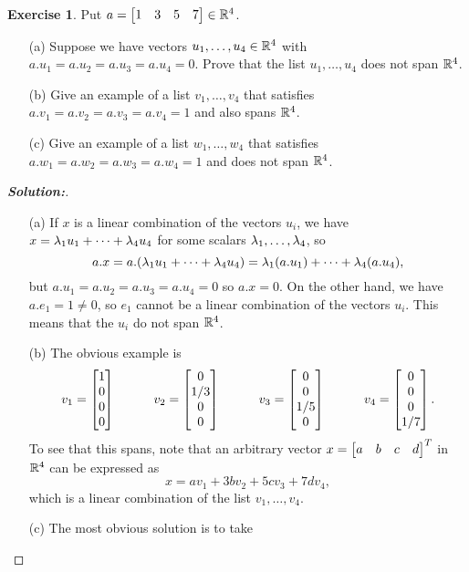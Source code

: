 \documentclass[a4paper]{amsart}
\theoremstyle{definition}
\newtheorem{exercise}{Exercise}
\newenvironment{solution}{\begin{proof}[\textbf{Solution:}] \vphantom{u}}{\end{proof}}
\begin{document}
\begin{exercise}\label{ex-fullspan-ii}
 Put $a=\left[\begin{matrix} 1 & 3 & 5 & 7 \end{matrix}\right]\in{\mathbb{R}}^4$.
 \begin{itemize}
  \item[(a)] Suppose we have vectors $u_1,\dotsc,u_4\in{\mathbb{R}}^4$ with
   $a.u_1=a.u_2=a.u_3=a.u_4=0$.  Prove that the list $u_1,\dotsc,u_4$
   does not span ${\mathbb{R}}^4$.
  \item[(b)] Give an example of a list $v_1,\dotsc,v_4$ that 
   satisfies $a.v_1=a.v_2=a.v_3=a.v_4=1$ and also spans ${\mathbb{R}}^4$.
  \item[(c)] Give an example of a list $w_1,\dotsc,w_4$ that 
   satisfies $a.w_1=a.w_2=a.w_3=a.w_4=1$ and does not span ${\mathbb{R}}^4$.
 \end{itemize}
\end{exercise}
\begin{solution}
 \begin{itemize}
  \item[(a)] If $x$ is a linear combination of the vectors $u_i$, we
   have $x=\lambda_1u_1+\dotsb+\lambda_4u_4$ for some scalars
   $\lambda_1,\dotsc,\lambda_4$, so 
   \[ a.x = a.(\lambda_1u_1+\dotsb+\lambda_4u_4) =
       \lambda_1(a.u_1) + \dotsb + \lambda_4(a.u_4),
   \]
   but $a.u_1=a.u_2=a.u_3=a.u_4=0$ so $a.x=0$.  On the other hand, we
   have $a.e_1=1\neq 0$, so $e_1$ cannot be a linear combination of
   the vectors $u_i$.  This means that the $u_i$ do not span ${\mathbb{R}}^4$.
  \item[(b)] The obvious example is 
   \[ v_1 = \left[\begin{matrix} 1 \\ 0 \\ 0 \\ 0 \end{matrix}\right] \hspace{3em} 
      v_2 = \left[\begin{matrix} 0 \\ 1/3 \\ 0 \\ 0 \end{matrix}\right] \hspace{3em} 
      v_3 = \left[\begin{matrix} 0 \\ 0 \\ 1/5 \\ 0 \end{matrix}\right] \hspace{3em} 
      v_4 = \left[\begin{matrix} 0 \\ 0 \\ 0 \\ 1/7 \end{matrix}\right].
   \]
   To see that this spans, note that an arbitrary vector
   $x=\left[\begin{matrix} a&b&c&d\end{matrix}\right]^T$ in ${\mathbb{R}}^4$ can be expressed as 
   \[ x = a v_1 + 3b v_2 + 5c v_3 + 7d v_4, \]
   which is a linear combination of the list $v_1,\dotsc,v_4$.
  \item[(c)] The most obvious solution is to take

\end{itemize}
\end{solution}
\end{document}
